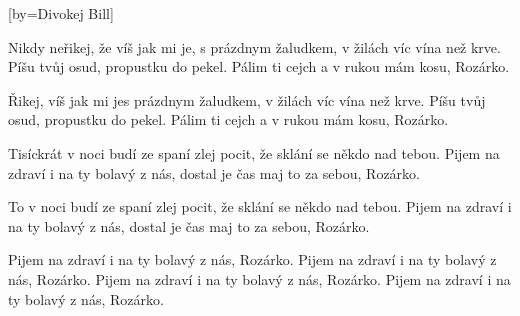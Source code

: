 [by={Divokej Bill}]

\beginverse{}
Nikdy neřikej, že víš jak mi je, s prázdnym
žaludkem, v žilách víc vína než krve.
Píšu tvůj osud, propustku do pekel.
Pálim ti cejch a v rukou mám kosu, Rozárko.
\endverse{}

\beginverse{}
Řikej, víš jak mi jes prázdnym
žaludkem, v žilách víc vína než krve.
Píšu tvůj osud, propustku do pekel.
Pálim ti cejch a v rukou mám kosu, Rozárko.
\endverse{}

\beginverse{}
Tisíckrát v noci budí ze spaní zlej
pocit, že sklání se někdo nad tebou.
Pijem na zdraví i na ty bolavý z nás,
dostal je čas maj to za sebou, Rozárko.
\endverse{}

\beginverse{}
To v noci budí ze spaní zlej
pocit, že sklání se někdo nad tebou.
Pijem na zdraví i na ty bolavý z nás,
dostal je čas maj to za sebou, Rozárko.
\endverse{}

\beginverse{}
Pijem na zdraví i na ty bolavý z nás, Rozárko.
Pijem na zdraví i na ty bolavý z nás, Rozárko.
Pijem na zdraví i na ty bolavý z nás, Rozárko.
Pijem na zdraví i na ty bolavý z nás, Rozárko.
\endverse{}

\endsong{}
